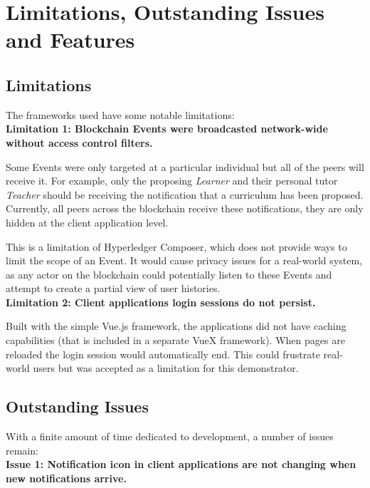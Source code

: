 \section{Limitations, Outstanding Issues and Features}

\subsection{Limitations}

The frameworks used have some notable limitations:
\vspace{0.25cm}\\
\textbf{Limitation 1: Blockchain Events were broadcasted network-wide without access control filters.}

Some Events were only targeted at a particular individual but all of the peers will receive it.
For example, only the proposing \textit{Learner} and their personal tutor \textit{Teacher} should 
be receiving the notification that a curriculum has been proposed. Currently, all peers across the 
blockchain receive these notifications, they are only hidden at the client application level.

This is a limitation of Hyperledger Composer, which does not provide ways to limit the scope of an Event.
It would cause privacy issues for a real-world system, as any actor on the blockchain could potentially 
listen to these Events and attempt to create a partial view of user histories.
\vspace{0.25cm}\\
\textbf{Limitation 2: Client applications login sessions do not persist.}

Built with the simple Vue.js framework, the applications did not have caching capabilities 
(that is included in a separate VueX framework). When pages are reloaded the login session 
would automatically end. This could frustrate real-world users but was accepted as a limitation 
for this demonstrator.

\clearpage
\subsection{Outstanding Issues}

With a finite amount of time dedicated to development, a number of issues remain:
\vspace{0.25cm}\\
\textbf{Issue 1: Notification icon in client applications are not changing when new notifications arrive.}

